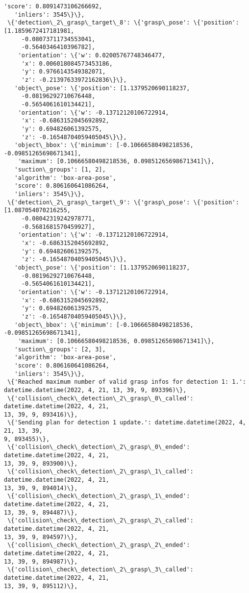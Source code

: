 \documentclass[11pt]{article}
\begin{document}
\begin{tcolorbox}[breakable, size=fbox, boxrule=.5pt, pad at break*=1mm, opacityfill=0]
\begin{Verbatim}[commandchars=\\\{\}]
   'score': 0.8091473106266692,
   'inliers': 3545\}\},
 \{'detection\_2\_grasp\_target\_8': \{'grasp\_pose': \{'position': [1.1859672417181981,
     -0.08073711734553041,
     -0.5640346410396782],
    'orientation': \{'w': 0.02005767748346477,
     'x': 0.006018084573453186,
     'y': 0.9766143549382071,
     'z': -0.21397633972162836\}\},
   'object\_pose': \{'position': [1.1379520690118237,
     -0.08196292710676448,
     -0.5654061610134421],
    'orientation': \{'w': -0.13712120106722914,
     'x': -0.6863152045692892,
     'y': 0.694826061392575,
     'z': -0.16548704059405045\}\},
   'object\_bbox': \{'minimum': [-0.10666580498218536, -0.09851265698671341],
    'maximum': [0.10666580498218536, 0.09851265698671341]\},
   'suction\_groups': [1, 2],
   'algorithm': 'box-area-pose',
   'score': 0.806160641086264,
   'inliers': 3545\}\},
 \{'detection\_2\_grasp\_target\_9': \{'grasp\_pose': \{'position': [1.087054070216255,
     -0.08042319242978771,
     -0.5681681570459927],
    'orientation': \{'w': -0.13712120106722914,
     'x': -0.6863152045692892,
     'y': 0.694826061392575,
     'z': -0.16548704059405045\}\},
   'object\_pose': \{'position': [1.1379520690118237,
     -0.08196292710676448,
     -0.5654061610134421],
    'orientation': \{'w': -0.13712120106722914,
     'x': -0.6863152045692892,
     'y': 0.694826061392575,
     'z': -0.16548704059405045\}\},
   'object\_bbox': \{'minimum': [-0.10666580498218536, -0.09851265698671341],
    'maximum': [0.10666580498218536, 0.09851265698671341]\},
   'suction\_groups': [2, 3],
   'algorithm': 'box-area-pose',
   'score': 0.806160641086264,
   'inliers': 3545\}\},
 \{'Reached maximum number of valid grasp infos for detection 1: 1.':
datetime.datetime(2022, 4, 21, 13, 39, 9, 893396)\},
 \{'collision\_check\_detection\_2\_grasp\_0\_called': datetime.datetime(2022, 4, 21,
13, 39, 9, 893416)\},
 \{'Sending plan for detection 1 update.': datetime.datetime(2022, 4, 21, 13, 39,
9, 893455)\},
 \{'collision\_check\_detection\_2\_grasp\_0\_ended': datetime.datetime(2022, 4, 21,
13, 39, 9, 893900)\},
 \{'collision\_check\_detection\_2\_grasp\_1\_called': datetime.datetime(2022, 4, 21,
13, 39, 9, 894014)\},
 \{'collision\_check\_detection\_2\_grasp\_1\_ended': datetime.datetime(2022, 4, 21,
13, 39, 9, 894487)\},
 \{'collision\_check\_detection\_2\_grasp\_2\_called': datetime.datetime(2022, 4, 21,
13, 39, 9, 894597)\},
 \{'collision\_check\_detection\_2\_grasp\_2\_ended': datetime.datetime(2022, 4, 21,
13, 39, 9, 894987)\},
 \{'collision\_check\_detection\_2\_grasp\_3\_called': datetime.datetime(2022, 4, 21,
13, 39, 9, 895112)\},

\end{Verbatim}
\end{tcolorbox}
\end{document}
